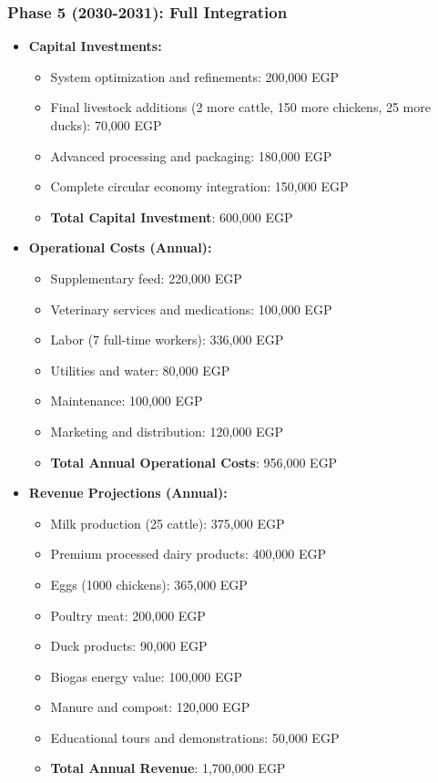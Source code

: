 \subsubsection{Phase 5 (2030-2031): Full Integration}
\begin{itemize}
    \item \textbf{Capital Investments:}
    \begin{itemize}
        \item System optimization and refinements: 200,000 EGP
        \item Final livestock additions (2 more cattle, 150 more chickens, 25 more ducks): 70,000 EGP
        \item Advanced processing and packaging: 180,000 EGP
        \item Complete circular economy integration: 150,000 EGP
        \item \textbf{Total Capital Investment}: 600,000 EGP
    \end{itemize}
    
    \item \textbf{Operational Costs (Annual):}
    \begin{itemize}
        \item Supplementary feed: 220,000 EGP
        \item Veterinary services and medications: 100,000 EGP
        \item Labor (7 full-time workers): 336,000 EGP
        \item Utilities and water: 80,000 EGP
        \item Maintenance: 100,000 EGP
        \item Marketing and distribution: 120,000 EGP
        \item \textbf{Total Annual Operational Costs}: 956,000 EGP
    \end{itemize}
    
    \item \textbf{Revenue Projections (Annual):}
    \begin{itemize}
        \item Milk production (25 cattle): 375,000 EGP
        \item Premium processed dairy products: 400,000 EGP
        \item Eggs (1000 chickens): 365,000 EGP
        \item Poultry meat: 200,000 EGP
        \item Duck products: 90,000 EGP
        \item Biogas energy value: 100,000 EGP
        \item Manure and compost: 120,000 EGP
        \item Educational tours and demonstrations: 50,000 EGP
        \item \textbf{Total Annual Revenue}: 1,700,000 EGP
    \end{itemize}
    

\end{itemize}
